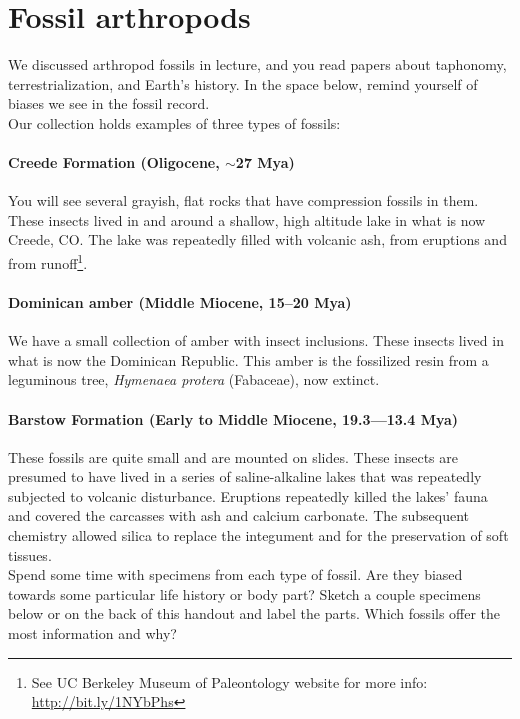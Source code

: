 \documentclass[letterpaper, 11pt]{article}
\begin{document}
\section*{Fossil arthropods}
We discussed arthropod fossils in lecture, and you read papers about taphonomy, terrestrialization, and Earth's history. In the space below, remind yourself of biases we see in the fossil record.\\

\noindent{}Our collection holds examples of three types of fossils: 

\paragraph{Creede Formation (Oligocene, $\sim$27 Mya)} You will see several grayish, flat rocks that have compression fossils in them. These insects lived in and around a shallow, high altitude lake in what is now Creede, CO. The lake was repeatedly filled with volcanic ash, from eruptions and from runoff\footnote{See UC Berkeley Museum of Paleontology website for more info: \url{http://bit.ly/1NYbPhs}}.

\paragraph{Dominican amber (Middle Miocene, 15--20 Mya)} We have a small collection of amber with insect inclusions. These insects lived in what is now the Dominican Republic. This amber is the fossilized resin from a leguminous tree, \textit{Hymenaea protera} (Fabaceae), now extinct.

\paragraph{Barstow Formation (Early to Middle Miocene, 19.3---13.4 Mya)} These fossils are quite small and are mounted on slides. These insects are presumed to have lived in a series of saline-alkaline lakes that was repeatedly subjected to volcanic disturbance. Eruptions repeatedly killed the lakes' fauna and covered the carcasses with ash and calcium carbonate. The subsequent chemistry allowed silica to replace the integument and for the preservation of soft tissues.\\

\noindent{}Spend some time with specimens from each type of fossil. Are they biased towards some particular life history or body part? Sketch a couple specimens below or on the back of this handout and label the parts. Which fossils offer the most information and why?\\
\end{document}
